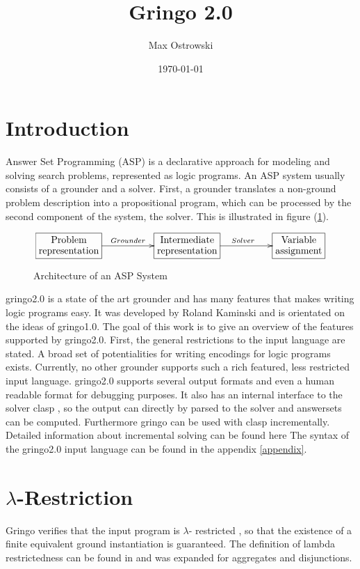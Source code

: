 \documentclass[a4paper,10pt]{article}
\author{Max Ostrowski}
\title{Gringo 2.0}
\date{\today}
\begin{document}
\maketitle
\tableofcontents
\section{Introduction}
Answer Set Programming (ASP) \cite{baral02a} is a declarative approach for modeling and solving search problems, represented as logic programs.
An ASP system usually consists of a grounder and a solver.
First, a grounder translates a non-ground problem description into a propositional program, which can be processed by the second component of the system, the solver. This is illustrated in figure (\ref{fig:ASP}).
\begin{figure}[h]
\[
\xymatrix{*+[F]\txt{Problem\\representation}\ar[rr]^{Grounder}&&
		*+[F]\txt{Intermediate\\ representation} \ar[rr]^{Solver}&&
		*+[F]\txt{Variable\\ assignment}}
\]
\caption{Architecture of an ASP System}
\label{fig:ASP}
\end{figure}
gringo2.0 is a state of the art grounder and has many features that makes writing logic programs easy.
It was developed by Roland Kaminski and is orientated on the ideas of gringo1.0.
The goal of this work is to give an overview of the features supported by gringo2.0. First, the general restrictions to the input language are stated. A broad set of potentialities for writing encodings for logic programs exists. Currently, no other grounder supports such a rich featured, less restricted input language.
gringo2.0 supports several output formats and even a human readable format for debugging purposes.
It also has an internal interface to the solver clasp \cite{gekanesc07b}, so the output can directly by parsed to the solver and answersets can be computed.
Furthermore gringo can be used with clasp incrementally. Detailed information about incremental solving can be found here \cite{IncrementalASP} 
The syntax of the gringo2.0 input language can be found in the appendix \ref{appendix}.

\section{$\lambda$-Restriction}
\label{domainrestricted}
Gringo verifies that the input program is $\lambda$-
restricted \cite{gringopaper}, so that the existence of a finite equivalent ground instantiation is guaranteed. The definition of lambda restrictedness can be found in \cite{gringopaper} and was expanded for aggregates and disjunctions.
\end{document}
